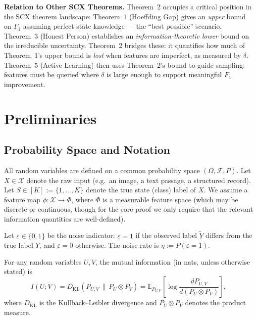 \documentclass[12pt,a4paper]{article}
\newcommand{\E}{\mathbb{E}}
\newcommand{\cX}{\mathcal{X}}
\newcommand{\KL}{D_{\mathrm{KL}}}
\begin{document}
\medskip\noindent
\textbf{Relation to Other SCX Theorems.}
Theorem~2 occupies a critical position in the \textsf{SCX} theorem landscape:
Theorem~1 (Hoeffding Gap) gives an \emph{upper} bound on $F_1$ assuming perfect
state knowledge --- the ``best possible'' scenario.  Theorem~3 (Honest Person)
establishes an \emph{information-theoretic lower} bound on the irreducible
uncertainty.  Theorem~2 bridges these: it quantifies how much of Theorem~1's
upper bound is \emph{lost} when features are imperfect, as measured by
$\delta$.  Theorem~5 (Active Learning) then uses Theorem~2's bound to guide
sampling: features must be queried where $\delta$ is large enough to support
meaningful $F_1$ improvement.

\section{Preliminaries}
\label{sec:prelim}

\subsection{Probability Space and Notation}

All random variables are defined on a common probability space
$(\Omega, \mathcal{F}, P)$.  Let $X \in \cX$ denote the raw input (e.g.\ an
image, a text passage, a structured record).  Let $S \in [K] := \{1,\dots,K\}$
denote the true state (class) label of $X$.  We assume a feature map
$\phi: \cX \to \Phi$, where $\Phi$ is a measurable feature space (which may be
discrete or continuous, though for the core proof we only require that the
relevant information quantities are well-defined).

Let $\varepsilon \in \{0,1\}$ be the noise indicator: $\varepsilon=1$ if the
observed label $\tilde{Y}$ differs from the true label $Y$, and $\varepsilon=0$
otherwise.  The noise rate is $\eta := P(\varepsilon=1)$.

For any random variables $U, V$, the mutual information (in nats, unless
otherwise stated) is
\begin{equation}\label{eq:mi-def}
    I(U; V) = \KL(P_{U,V} \,\|\, P_U \otimes P_V)
            = \E_{P_{U,V}}\!\left[\log\frac{dP_{U,V}}{d(P_U \otimes P_V)}\right],
\end{equation}
where $\KL$ is the Kullback--Leibler divergence and $P_U \otimes P_V$ denotes
the product measure.
\end{document}
